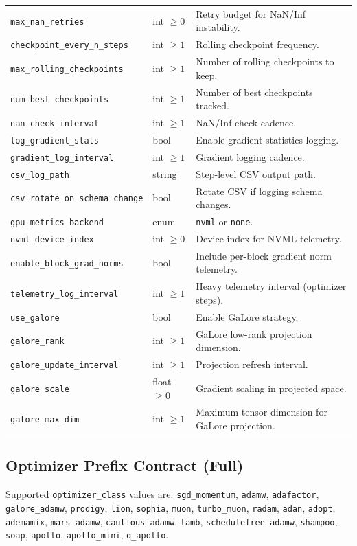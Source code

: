 \begin{longtable}{p{5.1cm}p{2.4cm}p{7.0cm}}
\texttt{max\_nan\_retries} & int $\ge 0$ & Retry budget for NaN/Inf instability. \\
\texttt{checkpoint\_every\_n\_steps} & int $\ge 1$ & Rolling checkpoint frequency. \\
\texttt{max\_rolling\_checkpoints} & int $\ge 1$ & Number of rolling checkpoints to keep. \\
\texttt{num\_best\_checkpoints} & int $\ge 1$ & Number of best checkpoints tracked. \\
\texttt{nan\_check\_interval} & int $\ge 1$ & NaN/Inf check cadence. \\
\texttt{log\_gradient\_stats} & bool & Enable gradient statistics logging. \\
\texttt{gradient\_log\_interval} & int $\ge 1$ & Gradient logging cadence. \\
\texttt{csv\_log\_path} & string & Step-level CSV output path. \\
\texttt{csv\_rotate\_on\_schema\_change} & bool & Rotate CSV if logging schema changes. \\
\texttt{gpu\_metrics\_backend} & enum & \texttt{nvml} or \texttt{none}. \\
\texttt{nvml\_device\_index} & int $\ge 0$ & Device index for NVML telemetry. \\
\texttt{enable\_block\_grad\_norms} & bool & Include per-block gradient norm telemetry. \\
\texttt{telemetry\_log\_interval} & int $\ge 1$ & Heavy telemetry interval (optimizer steps). \\
\texttt{use\_galore} & bool & Enable GaLore strategy. \\
\texttt{galore\_rank} & int $\ge 1$ & GaLore low-rank projection dimension. \\
\texttt{galore\_update\_interval} & int $\ge 1$ & Projection refresh interval. \\
\texttt{galore\_scale} & float $\ge 0$ & Gradient scaling in projected space. \\
\texttt{galore\_max\_dim} & int $\ge 1$ & Maximum tensor dimension for GaLore projection. \\
\bottomrule
\end{longtable}
\normalsize

\subsection{Optimizer Prefix Contract (Full)}

Supported \texttt{optimizer\_class} values are:
\texttt{sgd\_momentum}, \texttt{adamw}, \texttt{adafactor}, \texttt{galore\_adamw}, \texttt{prodigy}, \texttt{lion}, \texttt{sophia}, \texttt{muon}, \texttt{turbo\_muon}, \texttt{radam}, \texttt{adan}, \texttt{adopt}, \texttt{ademamix}, \texttt{mars\_adamw}, \texttt{cautious\_adamw}, \texttt{lamb}, \texttt{schedulefree\_adamw}, \texttt{shampoo}, \texttt{soap}, \texttt{apollo}, \texttt{apollo\_mini}, \texttt{q\_apollo}.

